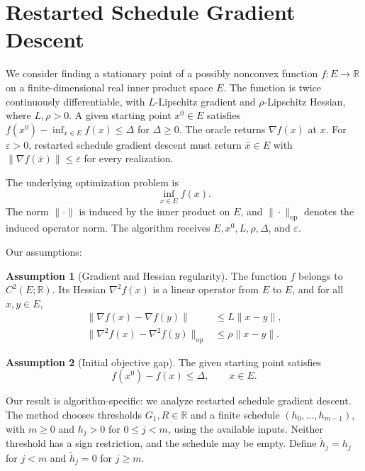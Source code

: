\documentclass[10pt]{article}
\theoremstyle{definition}
\newtheorem{assumption}{Assumption}
\begin{document}
\section*{Restarted Schedule Gradient Descent}
We consider finding a stationary point of a possibly nonconvex function $f:E\to\mathbb{R}$ on a finite-dimensional real inner product space $E$. The function is twice continuously differentiable, with $L$-Lipschitz gradient and $\rho$-Lipschitz Hessian, where $L,\rho>0$. A given starting point $x^0\in E$ satisfies $f(x^0)-\inf_{x\in E}f(x)\leq\Delta$ for $\Delta\geq0$. The oracle returns $\nabla f(x)$ at $x$. For $\varepsilon>0$, restarted schedule gradient descent must return $\bar{x}\in E$ with $\|\nabla f(\bar{x})\|\leq\varepsilon$ for every realization.

The underlying optimization problem is
\[
\inf_{x\in E} f(x).
\]
The norm $\|\cdot\|$ is induced by the inner product on $E$, and $\|\cdot\|_{\mathrm{op}}$ denotes the induced operator norm. The algorithm receives $E,x^0,L,\rho,\Delta$, and $\varepsilon$.

Our assumptions:
\begin{assumption}[Gradient and Hessian regularity]
The function $f$ belongs to $C^2(E;\mathbb{R})$. Its Hessian $\nabla^2 f(x)$ is a linear operator from $E$ to $E$, and for all $x,y\in E$,
\[
\begin{aligned}
\|\nabla f(x)-\nabla f(y)\|&\leq L\|x-y\|,\\
\|\nabla^2 f(x)-\nabla^2 f(y)\|_{\mathrm{op}}&\leq\rho\|x-y\|.
\end{aligned}
\]
\end{assumption}

\begin{assumption}[Initial objective gap]
The given starting point satisfies
\[
f(x^0)-f(x)\leq\Delta,\qquad x\in E.
\]
\end{assumption}

Our result is algorithm-specific: we analyze restarted schedule gradient descent. The method chooses thresholds $G_1,R\in\mathbb{R}$ and a finite schedule $(h_0,\ldots,h_{m-1})$, with $m\geq0$ and $h_j>0$ for $0\leq j<m$, using the available inputs. Neither threshold has a sign restriction, and the schedule may be empty. Define $\widetilde h_j=h_j$ for $j<m$ and $\widetilde h_j=0$ for $j\geq m$.
\end{document}
